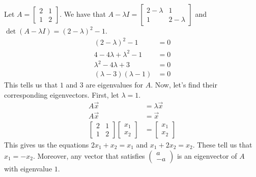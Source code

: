 \begin{example}
    Let $A=\begin{bmatrix}
        2 & 1 \\
        1 & 2
    \end{bmatrix}$. We have that $A-\lambda I=\begin{bmatrix}
        2 - \lambda & 1\\
        1 & 2 - \lambda
    \end{bmatrix}$ and $\det(A-\lambda I)=(2-\lambda)^2-1$.
    \begin{align*}
        (2-\lambda)^2-1&=0\\
        4-4\lambda+\lambda^2-1&=0\\
        \lambda^2-4\lambda+3&=0\\
        (\lambda -3)(\lambda-1)&=0
    \end{align*}
    This tells us that $1$ and $3$ are eigenvalues for $A$. Now, let's find their corresponding eigenvectors. First, let $\lambda=1$.
    \begin{align*}
        A\vec{x}&=\lambda\vec{x}\\
        A\vec{x}&=\vec{x}\\
        \begin{bmatrix}
            2 & 1\\
            1 & 2
        \end{bmatrix}\begin{bmatrix}
            x_1 \\ x_2
        \end{bmatrix}&=\begin{bmatrix}
            x_1 \\ x_2
        \end{bmatrix}
    \end{align*}
    This gives us the equations $2x_1+x_2=x_1$ and $x_1+2x_2=x_2$. These tell us that $x_1=-x_2$. Moreover, any vector that satisfies $\begin{pmatrix}
        a \\ -a
    \end{pmatrix}$ is an eigenvector of $A$ with eigenvalue $1$.


\end{example}
